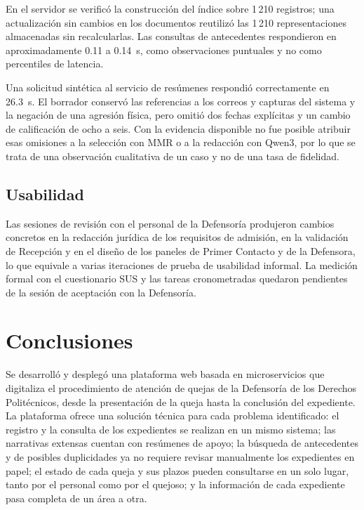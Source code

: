 \documentclass[conference,letterpaper]{IEEEtran}
\begin{document}
En el servidor se verificó la construcción del índice sobre 1\,210 registros; una actualización sin cambios en los documentos reutilizó las 1\,210 representaciones almacenadas sin recalcularlas. Las consultas de antecedentes respondieron en aproximadamente 0.11 a 0.14~s, como observaciones puntuales y no como percentiles de latencia.

Una solicitud sintética al servicio de resúmenes respondió correctamente en 26.3~s. El borrador conservó las referencias a los correos y capturas del sistema y la negación de una agresión física, pero omitió dos fechas explícitas y un cambio de calificación de ocho a seis. Con la evidencia disponible no fue posible atribuir esas omisiones a la selección con MMR o a la redacción con Qwen3, por lo que se trata de una observación cualitativa de un caso y no de una tasa de fidelidad.

\subsection{Usabilidad}

Las sesiones de revisión con el personal de la Defensoría produjeron cambios concretos en la redacción jurídica de los requisitos de admisión, en la validación de Recepción y en el diseño de los paneles de Primer Contacto y de la Defensora, lo que equivale a varias iteraciones de prueba de usabilidad informal. La medición formal con el cuestionario SUS y las tareas cronometradas quedaron pendientes de la sesión de aceptación con la Defensoría.

\section{Conclusiones}

Se desarrolló y desplegó una plataforma web basada en microservicios que digitaliza el procedimiento de atención de quejas de la Defensoría de los Derechos Politécnicos, desde la presentación de la queja hasta la conclusión del expediente. La plataforma ofrece una solución técnica para cada problema identificado: el registro y la consulta de los expedientes se realizan en un mismo sistema; las narrativas extensas cuentan con resúmenes de apoyo; la búsqueda de antecedentes y de posibles duplicidades ya no requiere revisar manualmente los expedientes en papel; el estado de cada queja y sus plazos pueden consultarse en un solo lugar, tanto por el personal como por el quejoso; y la información de cada expediente pasa completa de un área a otra.
\end{document}
